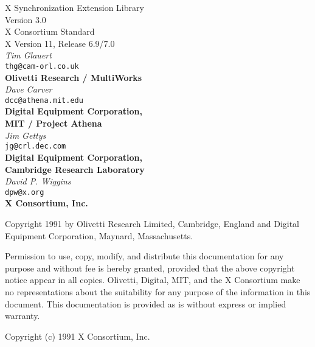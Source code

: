 \begin{center}

{\large X Synchronization Extension Library}\\[10pt]
{\large Version 3.0}\\[15pt]
{\large X Consortium Standard}\\[15pt]
{\large X Version 11, Release 6.9/7.0}\\[15pt]
{\it Tim Glauert}\\[0pt]
{\tt thg@cam-orl.co.uk}\\[0pt]
{\bf Olivetti Research / MultiWorks}\\[5pt]
{\it Dave Carver}\\[0pt]
{\tt dcc@athena.mit.edu}\\[0pt]
{\bf Digital Equipment Corporation,}\\[0pt]
{\bf MIT / Project Athena}\\[5pt]
{\it Jim Gettys}\\[0pt]
{\tt jg@crl.dec.com}\\[0pt]
{\bf Digital Equipment Corporation,}\\[0pt]
{\bf Cambridge Research Laboratory}\\[5pt]
{\it David P. Wiggins}\\[0pt]
{\tt dpw@x.org}\\[0pt]
{\bf X Consortium, Inc.}\\[0pt]

\end {center}

Copyright 1991 by Olivetti Research Limited, Cambridge, England and
Digital Equipment Corporation, Maynard, Massachusetts.

{\small Permission to use, copy, modify, and distribute this documentation
for any purpose and without fee is hereby granted, provided that the above
copyright notice appear in all copies. Olivetti, Digital, MIT, and the
X Consortium
make no representations about the suitability for any purpose of the
information in this document. This documentation is provided as is without
express or implied warranty.}

Copyright (c) 1991 X Consortium, Inc.

